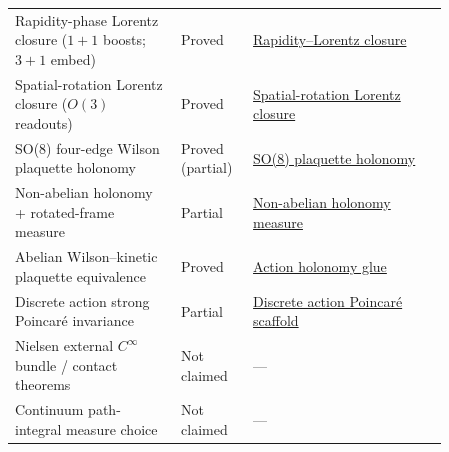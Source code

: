 \documentclass[11pt]{amsart}
\begin{document}
\begin{table}[ht]
\begin{tabular}{>{\raggedright\arraybackslash}p{0.34\linewidth}>{\raggedright\arraybackslash}p{0.12\linewidth}>{\raggedright\arraybackslash}p{0.40\linewidth}}
    Rapidity-phase Lorentz closure ($1{+}1$ boosts; $3{+}1$ embed) & Proved & \hyperref[lean:rapidity-lorentz-closure]{Rapidity--Lorentz closure} \\
    Spatial-rotation Lorentz closure ($O(3)$ readouts) & Proved & \hyperref[lean:spatial-rotation-lorentz-closure]{Spatial-rotation Lorentz closure} \\
    SO(8) four-edge Wilson plaquette holonomy & Proved (partial) & \hyperref[lean:so8-plaquette-holonomy]{SO(8) plaquette holonomy} \\
    Non-abelian holonomy + rotated-frame measure & Partial & \hyperref[lean:non-abelian-holonomy-measure]{Non-abelian holonomy measure} \\
    Abelian Wilson--kinetic plaquette equivalence & Proved & \hyperref[lean:action-holonomy-glue]{Action holonomy glue} \\
    Discrete action strong Poincaré invariance & Partial & \hyperref[lean:discrete-action-poincare]{Discrete action Poincaré scaffold} \\
    Nielsen external $C^\infty$ bundle / contact theorems & Not claimed & --- \\
    Continuum path-integral measure choice & Not claimed & --- \\
    \bottomrule
  \end{tabular}
\end{table}
\end{document}
